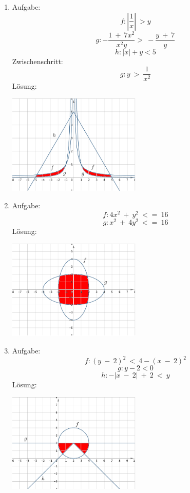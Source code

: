 \begin{enumerate}
\begin{center}
					\end{center}
	\item Aufgabe:
					\[f : |\frac 1 x| \ > y \]
					\[g : - \frac {1 \ + \ 7x^2} {x^2 y} > \ - \frac {y \ + \ 7} y\]
					\[h : |x| + y < 5\]
				Zwischenschritt:
					\[g : y \ > \ \frac 1 {x^2}\]
				L\"osung:
					\begin{center}
						\includegraphics[width=0.5\textwidth]{img/Aufgaben/Graphisch/A10.PNG}
					\end{center}
	\item Aufgabe:
					\[f : 4x^2 \ + \ y^2 \ <= \ 16\]
					\[g : x^2 \ + \ 4y^2 \ <= \ 16\]
				L\"osung:
					\begin{center}
						\includegraphics[width=0.5\textwidth]{img/Aufgaben/Graphisch/A11.PNG}
					\end{center}
	\item Aufgabe:
					\[f : (y \ - \ 2)^2 \ < \ 4 - (x \ - \ 2)^2\]
					\[g : y -2 < 0\]
					\[h : -|x \ - \ 2| \ + \ 2\ < \ y\]
				L\"osung:
					\begin{center}
						\includegraphics[width=0.5\textwidth]{img/Aufgaben/Graphisch/A12.PNG}

\end{center}
\end{enumerate}
